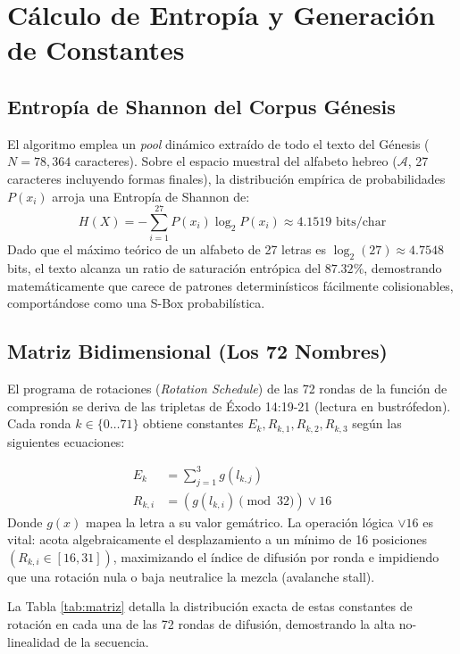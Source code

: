 \documentclass[10pt,twocolumn,letterpaper]{article}
\begin{document}
\section{Cálculo de Entropía y Generación de Constantes}

\subsection{Entropía de Shannon del Corpus Génesis}
El algoritmo emplea un \textit{pool} dinámico extraído de todo el texto del Génesis ($N=78,364$ caracteres). Sobre el espacio muestral del alfabeto hebreo ($\mathcal{A}$, 27 caracteres incluyendo formas finales), la distribución empírica de probabilidades $P(x_i)$ arroja una Entropía de Shannon de:
\begin{equation}
    H(X) = - \sum_{i=1}^{27} P(x_i) \log_2 P(x_i) \approx 4.1519 \text{ bits/char}
\end{equation}
Dado que el máximo teórico de un alfabeto de 27 letras es $\log_2(27) \approx 4.7548$ bits, el texto alcanza un ratio de saturación entrópica del $87.32\%$, demostrando matemáticamente que carece de patrones determinísticos fácilmente colisionables, comportándose como una S-Box probabilística.

\subsection{Matriz Bidimensional (Los 72 Nombres)}
El programa de rotaciones (\textit{Rotation Schedule}) de las 72 rondas de la función de compresión se deriva de las tripletas de Éxodo 14:19-21 (lectura en bustrófedon). Cada ronda $k \in \{0 \dots 71\}$ obtiene constantes $E_k, R_{k,1}, R_{k,2}, R_{k,3}$ según las siguientes ecuaciones:

\begin{align}
    E_k &= \sum_{j=1}^{3} g(l_{k,j}) \\
    R_{k,i} &= \left( g(l_{k,i}) \pmod{32} \right) \lor 16
\end{align}
Donde $g(x)$ mapea la letra a su valor gemátrico. La operación lógica $\lor 16$ es vital: acota algebraicamente el desplazamiento a un mínimo de 16 posiciones $\left( R_{k,i} \in [16, 31] \right)$, maximizando el índice de difusión por ronda e impidiendo que una rotación nula o baja neutralice la mezcla (avalanche stall).

La Tabla \ref{tab:matriz} detalla la distribución exacta de estas constantes de rotación en cada una de las 72 rondas de difusión, demostrando la alta no-linealidad de la secuencia.
\end{document}
